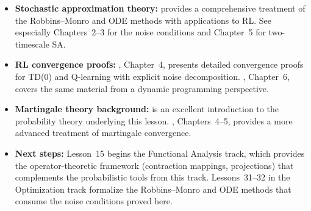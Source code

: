 \documentclass[11pt,a4paper]{article}
\begin{document}
\begin{itemize}[nosep]
  \item \textbf{Stochastic approximation theory:}
    \citet{borkar2008} provides a comprehensive treatment
    of the Robbins--Monro and ODE methods with applications
    to RL.  See especially Chapters~2--3 for the noise
    conditions and Chapter~5 for two-timescale SA.

  \item \textbf{RL convergence proofs:}
    \citet{szepesvari2010}, Chapter~4, presents detailed
    convergence proofs for TD(0) and Q-learning with
    explicit noise decomposition.
    \citet{bertsekas2012}, Chapter~6, covers the same
    material from a dynamic programming perspective.

  \item \textbf{Martingale theory background:}
    \citet{williams1991} is an excellent introduction to
    the probability theory underlying this lesson.
    \citet{durrett2019}, Chapters~4--5, provides a more
    advanced treatment of martingale convergence.

  \item \textbf{Next steps:}
    Lesson~15 begins the Functional Analysis track, which
    provides the operator-theoretic framework (contraction
    mappings, projections) that complements the
    probabilistic tools from this track.  Lessons~31--32
    in the Optimization track formalize the Robbins--Monro
    and ODE methods that consume the noise conditions
    proved here.
\end{itemize}


\end{document}
